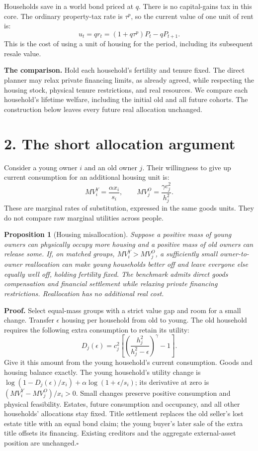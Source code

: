 \documentclass[11pt]{article}
\newtheorem{proposition}{Proposition}
\newcommand{\pageheading}[1]{\section*{#1}}
\begin{document}
Households save in a world bond priced at $q$. There is no capital-gains
tax in this core. The ordinary property-tax rate is $\tau^p$, so the current value of
one unit of rent is:
\begin{equation}
 u_t=q r_t=(1+q\tau^p)P_t-qP_{t+1}.
 \label{eq:simple_user_cost}
\end{equation}
This is the cost of using a unit of housing for the period, including its
subsequent resale value.

\textbf{The comparison.} Hold each household's fertility and tenure fixed.
The direct planner may relax private financing limits, as already agreed,
while respecting the housing stock, physical tenure restrictions, and real
resources. We compare each household's lifetime welfare, including the initial
old and all future cohorts. The construction below leaves every future real
allocation unchanged.

\newpage
\pageheading{2. The short allocation argument}

Consider a young owner $i$ and an old owner $j$. Their willingness to give up
current consumption for an additional housing unit is:
\begin{equation}
 MV_i^Y=\frac{\alpha x_i}{s_i},\qquad
 MV_j^O=\frac{\gamma c_j^2}{h_j^2}.
 \label{eq:simple_values}
\end{equation}
These are marginal rates of substitution, expressed in the same goods units.
They do not compare raw marginal utilities across people.

\begin{proposition}[Housing misallocation]
Suppose a positive mass of young owners can physically occupy more housing
and a positive mass of old owners can release some. If, on matched groups,
$MV_i^Y>MV_j^O$, a sufficiently small owner-to-owner reallocation can make
young households better off and leave everyone else equally well off, holding
fertility fixed. The benchmark admits direct goods compensation and financial
settlement while relaxing private financing restrictions. Reallocation has no
additional real cost.
\end{proposition}

\textbf{Proof.} Select equal-mass groups with a strict value gap and room for
a small change. Transfer $\epsilon$ housing per household from old to young.
The old household requires the following extra consumption to retain its utility:
\begin{equation}
 D_j(\epsilon)=c_j^2\left[
 \left(\frac{h_j^2}{h_j^2-\epsilon}\right)^\gamma-1\right].
 \label{eq:simple_compensation}
\end{equation}
Give it this amount from the young household's current consumption. Goods and
housing balance exactly. The young household's utility change is
$\log(1-D_j(\epsilon)/x_i)+\alpha\log(1+\epsilon/s_i)$; its derivative at
zero is $(MV_i^Y-MV_j^O)/x_i>0$. Small changes preserve positive consumption
and physical feasibility. Estates, future consumption and occupancy, and all
other households' allocations stay fixed. Title settlement replaces the old
seller's lost estate title with an equal bond claim; the young buyer's later
sale of the extra title offsets its financing. Existing creditors and the
aggregate external-asset position are unchanged.\hfill$\square$
\end{document}
